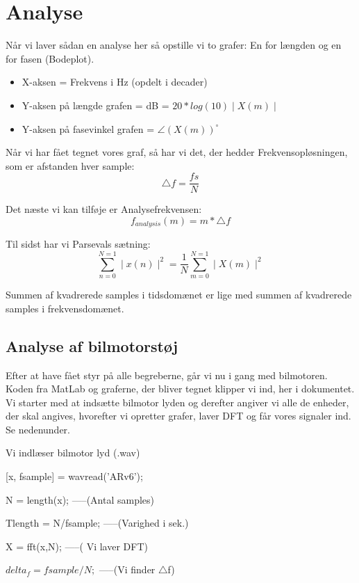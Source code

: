 \documentclass[12pt, letterpaper]{article}
\begin{document}
\section{Analyse}

Når vi laver sådan en analyse her så opstille vi to grafer: 
En for længden og en for fasen (Bodeplot). \\

\begin{itemize}
\item X-aksen = Frekvens i Hz (opdelt i decader)
\item Y-aksen på længde grafen = dB = $ 20*log(10)\mid X(m) \mid$ 
\item Y-aksen på fasevinkel grafen = $\angle (X(m))^{\circ}  $
\end{itemize}

Når vi har fået tegnet vores graf, så har vi det, der hedder Frekvensopløsningen, som er afstanden hver sample: 
$$\bigtriangleup f = \frac{fs}{N} $$

Det næste vi kan tilføje er Analysefrekvensen: 
$$f_{analysis}(m)=m*\bigtriangleup f$$

Til sidst har vi Parsevals sætning: 
$$ \sum\limits_{n=0}^{N=1} \mid x(n) \mid^2 = \frac{1}{N} \sum\limits_{m=0}^{N=1} \mid X(m) \mid^2    $$

Summen af kvadrerede samples i tidsdomænet er lige med summen af kvadrerede samples i frekvensdomænet.


\subsection{Analyse af bilmotorstøj}
Efter at have fået styr på alle begreberne, går vi nu i gang med bilmotoren. Koden fra MatLab og graferne, der bliver tegnet klipper vi ind, her i dokumentet. 
Vi starter med at indsætte bilmotor lyden og derefter angiver vi alle de enheder, der skal angives, hvorefter vi opretter grafer, laver DFT og får vores signaler ind. Se nedenunder. 

Vi indlæser bilmotor lyd (.wav)

[x, fsample] = wavread('ARv6');

N = length(x);       -----(Antal samples)
     
Tlength = N/fsample;     -----(Varighed i sek.)              

X = fft(x,N);   -----( Vi laver DFT)                       

$delta_f = fsample/N;$  -----(Vi finder $\bigtriangleup$f)
\end{document}
